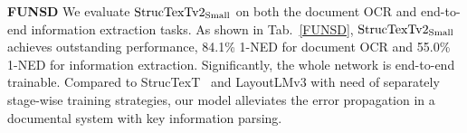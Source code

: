 \documentclass{article} %
\begin{document}
\noindent\textbf{FUNSD} We evaluate $\rm StrucTexTv2_{Small}$ on both the document OCR and end-to-end information extraction tasks. As shown in Tab.~\ref{FUNSD}, $\rm StrucTexTv2_{Small}$ achieves outstanding performance, 84.1\% 1-NED for document OCR and 55.0\% 1-NED for information extraction. Significantly, the whole network is end-to-end trainable. Compared to StrucTexT~\cite{li2021structext} and LayoutLMv3 with need of separately stage-wise training strategies, our model alleviates the error propagation in a documental system with key information parsing.

\begin{table}[ht]
\caption{Performance comparisons on FUNSD. We present the Normalized Edit Distance (1-NED) for the word-level document OCR and the entity-level information extraction. The \textbf{*} denotes a multi-stage process in which the methods are applied using our OCR results and entity boxes for word grouping in information extraction.}
\label{FUNSD}
\begin{minipage}[c]{0.53\linewidth}
\begin{center}
\end{center}
\end{minipage}
\begin{minipage}[c]{0.45\linewidth}
\begin{center}
\end{center}
\end{minipage}
\vspace{-0.5em}
\end{table}
\end{document}
